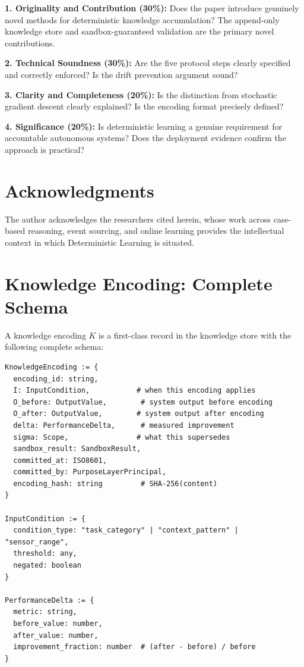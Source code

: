 \documentclass[12pt]{article}
\begin{document}
\textbf{1. Originality and Contribution (30\%):} Does the paper introduce genuinely novel methods for deterministic knowledge accumulation? The append-only knowledge store and sandbox-guaranteed validation are the primary novel contributions.

\textbf{2. Technical Soundness (30\%):} Are the five protocol steps clearly specified and correctly enforced? Is the drift prevention argument sound?

\textbf{3. Clarity and Completeness (20\%):} Is the distinction from stochastic gradient descent clearly explained? Is the encoding format precisely defined?

\textbf{4. Significance (20\%):} Is deterministic learning a genuine requirement for accountable autonomous systems? Does the deployment evidence confirm the approach is practical?

\section*{Acknowledgments}

The author acknowledges the researchers cited herein, whose work across case-based reasoning, event sourcing, and online learning provides the intellectual context in which Deterministic Learning is situated.


\section{Knowledge Encoding: Complete Schema}
\label{sec:knowledge-encoding-schema}

A knowledge encoding $K$ is a first-class record in the knowledge store with the following complete schema:

\begin{verbatim}
KnowledgeEncoding := {
  encoding_id: string,
  I: InputCondition,           # when this encoding applies
  O_before: OutputValue,        # system output before encoding
  O_after: OutputValue,        # system output after encoding
  delta: PerformanceDelta,      # measured improvement
  sigma: Scope,                # what this supersedes
  sandbox_result: SandboxResult,
  committed_at: ISO8601,
  committed_by: PurposeLayerPrincipal,
  encoding_hash: string         # SHA-256(content)
}

InputCondition := {
  condition_type: "task_category" | "context_pattern" | "sensor_range",
  threshold: any,
  negated: boolean
}

PerformanceDelta := {
  metric: string,
  before_value: number,
  after_value: number,
  improvement_fraction: number  # (after - before) / before
}
\end{verbatim}
\end{document}
